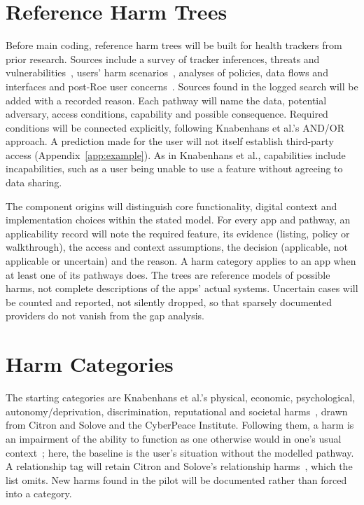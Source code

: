 \section{Reference Harm Trees} Before main coding, reference harm trees will be
built for health trackers from prior research. Sources include a survey of
tracker inferences, threats and vulnerabilities~\parencite{niksirat2024wearable},
users' harm scenarios~\parencite{gabriele2020understanding}, analyses of policies,
data flows and interfaces
\parencite{shipp2020period,malki2024exploring,hudig2025intimate} and post-Roe
user concerns~\parencite{cao2024deleted}. Sources found in the logged search
will be added with a recorded reason. Each pathway will name the data, potential
adversary, access conditions, capability and possible consequence. Required
conditions will be connected explicitly, following Knabenhans et al.'s
AND/OR approach. A prediction made for the user will not itself establish
third-party access (Appendix~\ref{app:example}). As in Knabenhans et al., capabilities include incapabilities, such as a user
being unable to use a feature without agreeing to data sharing.

The component origins will distinguish core functionality, digital context
and implementation choices within the stated model. For every app and
pathway, an applicability record will note the required feature, its
evidence (listing, policy or walkthrough), the access and context
assumptions, the decision (applicable, not applicable or uncertain) and the
reason. A harm category applies to an app when at least one of its pathways
does. The trees are reference models of possible harms, not complete
descriptions of the apps' actual systems. Uncertain cases will be counted and
reported, not silently dropped, so that sparsely documented providers do not
vanish from the gap analysis.

\section{Harm Categories} The starting categories are Knabenhans et al.'s
physical, economic, psychological, autonomy/\allowbreak deprivation, discrimination,
reputational and societal harms~\parencite[App.~A]{knabenhans2026harms},
drawn from Citron and Solove and the CyberPeace Institute. Following them, a
harm is an impairment of the ability to function as one otherwise would in
one's usual context~\parencite[\S4.1]{knabenhans2026harms}; here, the baseline
is the user's situation without the modelled pathway. A relationship tag will
retain Citron and Solove's relationship harms~\parencite{citron2021harms},
which the list omits. New harms found in the pilot will be documented rather
than forced into a category.


